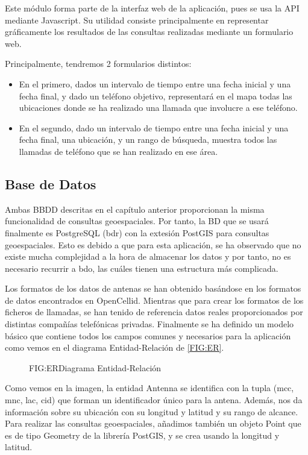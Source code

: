     Este módulo forma parte de la interfaz web de la aplicación, pues se usa la API mediante Javascript. Su utilidad consiste principalmente en representar gráficamente los resultados de las consultas realizadas mediante un formulario web.
    
    Principalmente, tendremos 2 formularios distintos:
    \begin{itemize}
      \item En el primero, dados un intervalo de tiempo entre una fecha inicial y una fecha final, y dado un teléfono objetivo, representará en el mapa todas las ubicaciones donde se ha realizado una llamada que involucre a ese teléfono.
      
      \item En el segundo, dado un intervalo de tiempo entre una fecha inicial y una fecha final, una ubicación, y un rango de búsqueda, muestra todos las llamadas de teléfono que se han realizado en ese área. 
    \end{itemize}
    
  \subsection{Base de Datos}
    Ambas BBDD descritas en el capítulo anterior proporcionan la misma funcionalidad de consultas geoespaciales.
    Por tanto, la BD que se usará finalmente es PostgreSQL (\ac{bdr}) con la extesión PostGIS para consultas geoespaciales. Esto es debido a que para esta aplicación, se ha observado que no existe mucha complejidad a la hora de almacenar los datos y por tanto, no es necesario recurrir a \ac{bdo}, las cuáles tienen una estructura más complicada. 

    Los formatos de los datos de antenas se han obtenido basándose en los formatos de datos encontrados en OpenCellid\cite{opencellid}.
    Mientras que para crear los formatos de los ficheros de llamadas, se han tenido de referencia datos reales proporcionados por distintas compañías telefónicas privadas.
    Finalmente se ha definido un modelo básico que contiene todos los campos comunes y necesarios para la aplicación como vemos en el diagrama Entidad-Relación de \ref{FIG:ER}.
    
    \begin{figure}[Diagrama Entidad-Relación]{FIG:ER}{Diagrama Entidad-Relación}
    \end{figure}
  
    Como vemos en la imagen, la entidad Antenna se identifica con la tupla (mcc, mnc, lac, cid) que forman un identificador único para la antena. Además, nos da información sobre su ubicación con su longitud y latitud y su rango de alcance. Para realizar las consultas geoespaciales, añadimos también un objeto Point que es de tipo Geometry de la librería PostGIS, y se crea usando la longitud y latitud.
    
